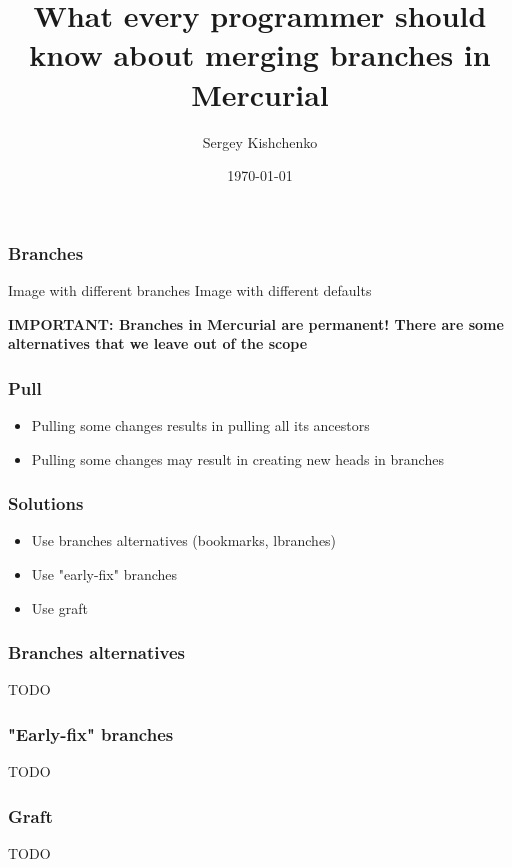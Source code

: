 \documentclass{beamer}
\title{What every programmer should know about merging branches in Mercurial}
\author{Sergey Kishchenko}
\date{\today}
\institute{DoctorMobile}
\begin{document}
\frame{\titlepage}

\begin{frame} 
\frametitle{Branches}
\begin{multicols}{2}
Image with different branches
\columnbreak
{}
Image with different defaults
\end{multicols}
\begin{center}
\textbf{IMPORTANT: Branches in Mercurial are permanent! There are some alternatives that we leave out of the scope}
\end{center}
\end{frame}

\begin{frame} 
\frametitle{Pull}
\begin{itemize}
\item Pulling some changes results in pulling all its ancestors
\item Pulling some changes may result in creating new heads in branches 
\end{itemize}
\end{frame}

\begin{frame} 
\frametitle{Solutions}
\begin{itemize}
\item Use branches alternatives (bookmarks, lbranches)
\item Use "early-fix" branches 
\item Use graft
\end{itemize}
\end{frame}

\begin{frame} 
\frametitle{Branches alternatives}
TODO
\end{frame}

\begin{frame}
\frametitle{"Early-fix" branches}
TODO
\end{frame}

\begin{frame}
\frametitle{Graft}
TODO
\end{frame}
\end{document}
